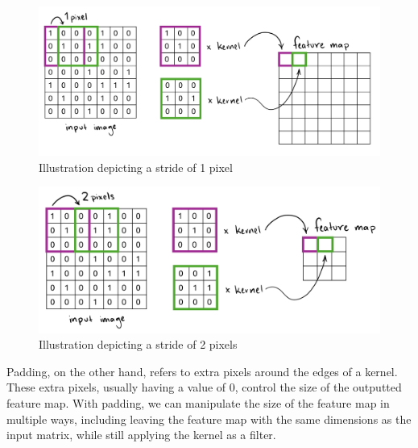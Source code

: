         \begin{figure}[H]
            \centering
            \includegraphics[width=1\linewidth]{cv/stridedepict.png}
            \caption{Illustration depicting a stride of 1 pixel}
            \label{fig:stridedepict}
        \end{figure}

        \begin{figure}[H]
            \centering
            \includegraphics[width=1\linewidth]{cv/stride2eg.png}
            \caption{Illustration depicting a stride of 2 pixels}
            \label{fig:stride2eg}
        \end{figure}

        Padding, on the other hand, refers to extra pixels around the edges of a kernel. These extra pixels, usually having a value of 0, control the size of the outputted feature map. With padding, we can manipulate the size of the feature map in multiple ways, including leaving the feature map with the same dimensions as the input matrix, while still applying the kernel as a filter.

